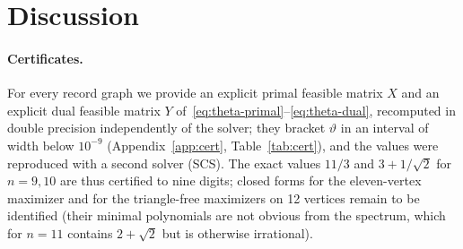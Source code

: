 \documentclass[11pt]{article}
\renewcommand{\theta}{\vartheta}
\begin{document}
\section{Discussion}\label{sec:discussion}

\paragraph{Certificates.} For every record graph we provide an explicit primal feasible matrix $X$ and an explicit dual feasible matrix $Y$ of~\eqref{eq:theta-primal}--\eqref{eq:theta-dual}, recomputed in double precision independently of the solver; they bracket $\theta$ in an interval of width below $10^{-9}$ (Appendix~\ref{app:cert}, Table~\ref{tab:cert}), and the values were reproduced with a second solver (SCS). The exact values $11/3$ and $3+1/\sqrt2$ for $n=9,10$ are thus certified to nine digits; closed forms for the eleven-vertex maximizer and for the triangle-free maximizers on 12 vertices remain to be identified (their minimal polynomials are not obvious from the spectrum, which for $n=11$ contains $2+\sqrt2$ but is otherwise irrational).
\end{document}
